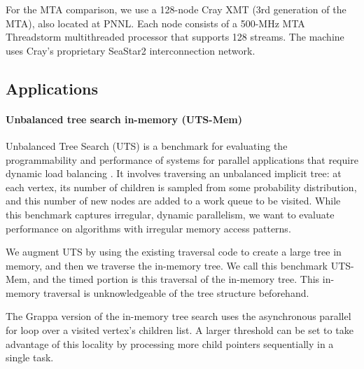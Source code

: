 For the MTA comparison, we use a 128-node Cray XMT (3rd generation
of the MTA), also located at PNNL. Each node consists of a 500-MHz MTA Threadstorm multithreaded
processor that supports 128 streams. The machine uses Cray's proprietary
SeaStar2 interconnection network.

\subsection{Applications}

\paragraph{Unbalanced tree search in-memory (UTS-Mem)}
Unbalanced Tree Search (UTS) is a benchmark
for evaluating the programmability and performance of systems for
parallel applications that require dynamic load balancing
\cite{Olivier:uts2006}. It involves traversing an unbalanced implicit
tree: at each vertex, its number of children is sampled from some
probability distribution, and this number of new nodes are added to a
work queue to be visited. While this benchmark captures irregular,
dynamic parallelism, we want to evaluate performance on algorithms
with irregular memory access patterns.

We augment UTS by using the existing traversal code to
create a large tree in memory, and then we traverse the in-memory
tree. We call this benchmark UTS-Mem, and the timed portion is this
traversal of the in-memory tree. This in-memory traversal is
unknowledgeable of the tree structure beforehand.


The Grappa version of the in-memory tree search uses the
asynchronous parallel for loop over a visited vertex's children 
list. A larger threshold can be set to take advantage of this 
locality by processing more child pointers sequentially in a single task.

